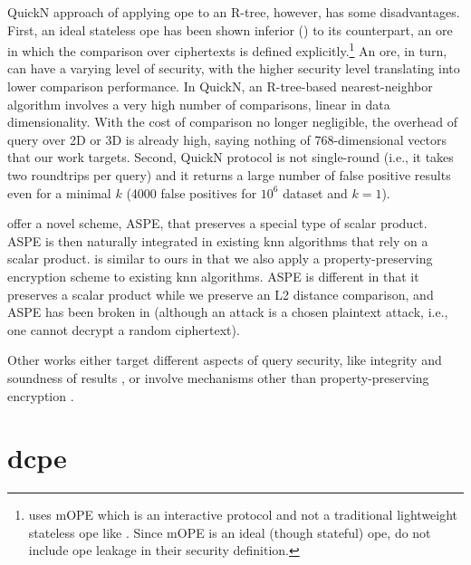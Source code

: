 		QuickN approach of applying \acrshort{ope} to an R-tree, however, has some disadvantages.
		First, an ideal stateless \acrshort{ope} has been shown inferior (\cite{ope-leakage}) to its counterpart, an \acrfull{ore} in which the comparison over ciphertexts is defined explicitly.\footnote{
			\cite{quick-n} uses mOPE \cite{ope-ideal-security-protocol} which is an interactive protocol and not a traditional lightweight stateless \acrshort{ope} like \cite{bclo-ope}.
			Since mOPE is an ideal (though stateful) \acrshort{ope}, \cite{quick-n} do not include \acrshort{ope} leakage in their security definition.
		}
		An \acrshort{ore}, in turn, can have a varying level of security, with the higher security level translating into lower comparison performance.
		In QuickN, an R-tree-based nearest-neighbor algorithm involves a very high number of comparisons, linear in data dimensionality.
		With the cost of comparison no longer negligible, the overhead of query over 2D or 3D is already high, saying nothing of 768-dimensional vectors that our work targets.
		Second, QuickN protocol is not single-round (i.e., it takes two roundtrips per query) and it returns a large number of false positive results even for a minimal $k$ (\num{4000} false positives for $10^6$ dataset and $k = 1$).

		\textcite{knn-aspe} offer a novel scheme, ASPE, that preserves a special type of scalar product.
		ASPE is then naturally integrated in existing \acrshort{knn} algorithms that rely on a scalar product.
		\cite{knn-aspe} is similar to ours in that we also apply a property-preserving encryption scheme to existing \acrshort{knn} algorithms.
		ASPE is different in that it preserves a scalar product while we preserve an L2 distance comparison, and ASPE has been broken in \cite{secure-nn-revisited-break-aspe} (although an attack is a chosen plaintext attack, i.e., one cannot decrypt a random ciphertext).

		Other works either target different aspects of query security, like integrity and soundness of results \cite{knn-integrity-soundness,svknn}, or involve mechanisms other than property-preserving encryption \cite{seceqp,practical-approx-knn,knn-sharing-keys,knn-mult-data-owners,knn-over-encrypted,knn-paillier,knn-blind,knn-homomorphism,knn-strong-location-privacy,knn-no-anonymizers,knn-efficient,knn-new-casper}.

	\section{\texorpdfstring{\acrlong{dcpe}}{Distance Comparison Preserving Encryption}}

